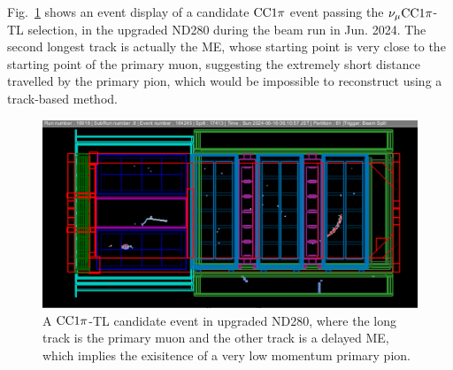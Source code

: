           Fig.~\ref{fig:cc1pi-tl} shows an event display of a candidate $\textrm{CC}1\pi$ event passing the $\nu_{\mu}\textrm{CC}1\pi$-TL selection, in the upgraded ND280 during the beam run in Jun. 2024.
          The second longest track is actually the ME, whose starting point is very close to the starting point of the primary muon, suggesting the extremely short distance travelled by the primary pion, which would be impossible to reconstruct using a track-based method.
          \begin{figure}[!htb] 	
               \centering 		
               \includegraphics[width=\sgfigwid\textwidth]{figures/shortPion.png}
               \caption{\label{fig:cc1pi-tl} A $\textrm{CC}1\pi$-TL candidate event in upgraded ND280, where the long track is the primary muon and the other track is a delayed ME, which implies the exisitence of a very low momentum primary pion.} 
          \end{figure}




